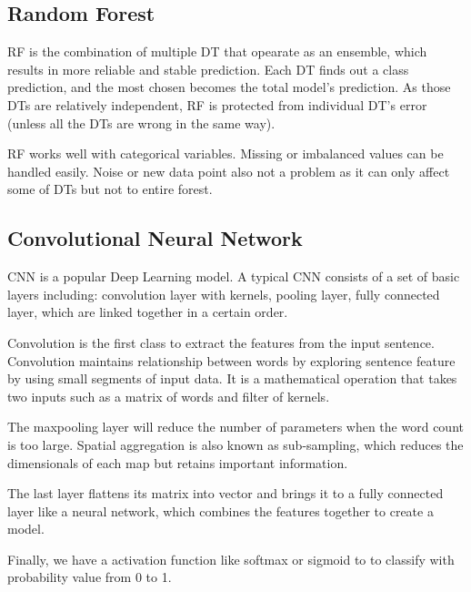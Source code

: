 \subsection{Random Forest}
RF is the combination of multiple DT that opearate as an ensemble, which results in more reliable and stable prediction. Each DT finds out a class prediction, and the most chosen becomes the total model's prediction. As those DTs are relatively independent, RF is protected from individual DT's error (unless all the DTs are wrong in the same way).

RF works well with categorical variables. Missing or imbalanced values can be handled easily. Noise or new data point also not a problem as it can only affect some of DTs but not to entire forest.

\subsection{Convolutional Neural Network}
CNN is a popular Deep Learning model. A typical CNN consists of a set of basic layers including: convolution layer with kernels, pooling layer, fully connected layer, which are linked together in a certain order.

Convolution is the first class to extract the features from the input sentence. Convolution maintains relationship between words by exploring sentence feature by using small segments of input data. It is a mathematical operation that takes two inputs such as a matrix of words and filter of kernels.

The maxpooling layer will reduce the number of parameters when the word count is too large. Spatial aggregation is also known as sub-sampling, which reduces the dimensionals of each map but retains important information.

The last layer flattens its matrix into vector and brings it to a fully connected layer like a neural network, which combines the features together to create a model. 

Finally, we have a activation function like softmax or sigmoid to to classify with probability value from 0 to 1.





